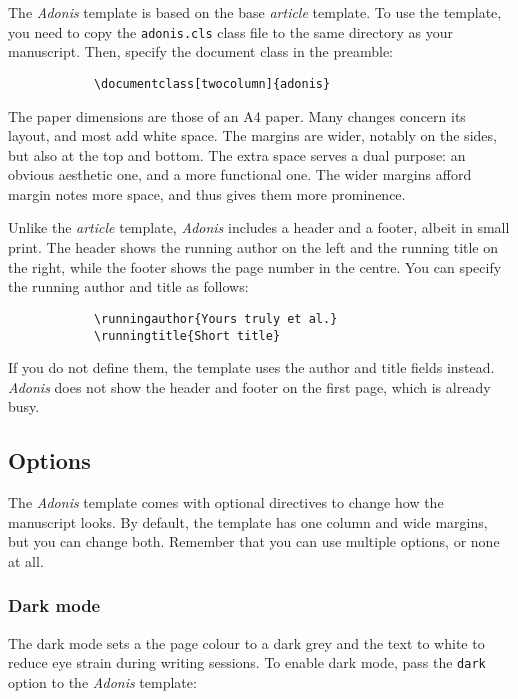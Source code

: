 \documentclass{adonis}
\begin{document}
		The \textit{Adonis} template is based on the base \textit{article} template.
		To use the template, you need to copy the \verb+adonis.cls+ class file to the same directory as your manuscript.
		Then, specify the document class in the preamble:
		
		\begin{verbatim}
			\documentclass[twocolumn]{adonis}
		\end{verbatim}
		
		The paper dimensions are those of an A4 paper.
		Many changes concern its layout, and most add white space.
		The margins are wider, notably on the sides, but also at the top and bottom.
		The extra space serves a dual purpose: an obvious aesthetic one, and a more functional one.
		The wider margins afford margin notes more space, and thus gives them more prominence.
		
		Unlike the \textit{article} template, \textit{Adonis} includes a header and a footer, albeit in small print.
		The header shows the running author on the left and the running title on the right, while the footer shows the page number in the centre.
		You can specify the running author and title as follows:
		
		\begin{verbatim}
			\runningauthor{Yours truly et al.}
			\runningtitle{Short title}
		\end{verbatim}
		
		If you do not define them, the template uses the author and title fields instead.
		\textit{Adonis} does not show the header and footer on the first page, which is already busy.
		
		\subsection{Options}
		
			The \textit{Adonis} template comes with optional directives to change how the manuscript looks.
			By default, the template has one column and wide margins, but you can change both.
			Remember that you can use multiple options, or none at all.
			
			\subsubsection{Dark mode}
			
				The dark mode sets a the page colour to a dark grey and the text to white to reduce eye strain during writing sessions.
				To enable dark mode, pass the \texttt{dark} option to the \textit{Adonis} template:
				
\end{document}
